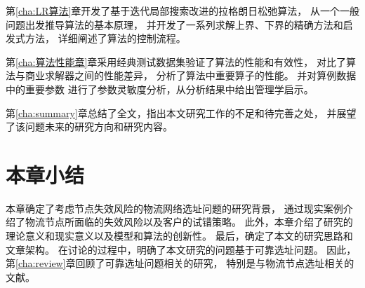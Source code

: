 第\ref{cha:LR算法}章开发了基于迭代局部搜索改进的拉格朗日松弛算法，
从一个一般问题出发推导算法的基本原理，
并开发了一系列求解上界、下界的精确方法和启发式方法，
详细阐述了算法的控制流程。

第\ref{cha:算法性能章}章采用经典测试数据集验证了算法的性能和有效性，
对比了算法与商业求解器之间的性能差异，
分析了算法中重要算子的性能。
并对算例数据中的重要参数
进行了参数灵敏度分析，从分析结果中给出管理学启示。

第\ref{cha:summary}章总结了全文，指出本文研究工作的不足和待完善之处，
并展望了该问题未来的研究方向和研究内容。


\section{本章小结} %
\label{sec:引言小结}
本章确定了考虑节点失效风险的物流网络选址问题的研究背景，
通过现实案例介绍了物流节点所面临的失效风险以及客户的试错策略。
此外，本章介绍了研究的理论意义和现实意义以及模型和算法的创新性。
最后，确定了本文的研究思路和文章架构。
在讨论的过程中，明确了本文研究的问题基于可靠选址问题。
因此，第\ref{cha:review}章回顾了可靠选址问题相关的研究，
特别是与物流节点选址相关的文献。
